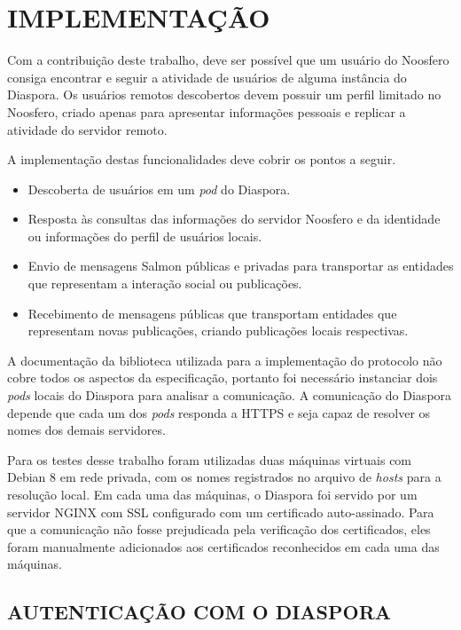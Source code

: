 \chapter{IMPLEMENTAÇÃO}
\label{chapter:4}

Com a contribuição deste trabalho, deve ser possível que um usuário do Noosfero
consiga encontrar e seguir a atividade de usuários de alguma instância do Diaspora.
Os usuários remotos descobertos devem possuir um perfil limitado no Noosfero,
criado apenas para apresentar informações pessoais e replicar a atividade do
servidor remoto.

A implementação destas funcionalidades deve cobrir os pontos a seguir.

\begin{itemize}
  \item{Descoberta de usuários em um \textit{pod} do Diaspora.}
  \item{Resposta às consultas das informações do servidor Noosfero e da identidade
        ou informações do perfil de usuários locais.}
  \item{Envio de mensagens Salmon públicas e privadas para transportar as entidades
        que representam a interação social ou publicações.}
  \item{Recebimento de mensagens públicas que transportam entidades que representam
        novas publicações, criando publicações locais respectivas.}
\end{itemize}

A documentação da biblioteca utilizada para a implementação do protocolo não cobre
todos os aspectos da especificação, portanto foi necessário instanciar dois
\textit{pods} locais do Diaspora para analisar a comunicação. A comunicação do
Diaspora depende que cada um dos \textit{pods} responda a HTTPS e seja capaz de
resolver os nomes dos demais servidores.

Para os testes desse trabalho foram utilizadas duas máquinas virtuais com Debian 8
em rede privada, com os nomes registrados no arquivo de \textit{hosts} para a
resolução local. Em cada uma das máquinas, o Diaspora foi servido por um servidor
NGINX com SSL configurado com um certificado auto-assinado. Para que a comunicação
não fosse prejudicada pela verificação dos certificados, eles foram manualmente
adicionados aos certificados reconhecidos em cada uma das máquinas.

\section{AUTENTICAÇÃO COM O DIASPORA}

